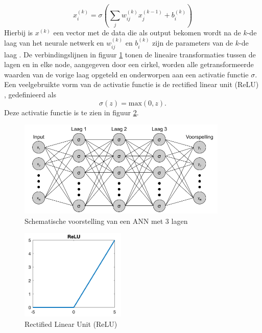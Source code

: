 \documentclass{report}
\begin{document}
\[ x^{(k)}_i = \sigma\left( \sum_j w^{(k)}_{ij} x^{(k-1)}_j + b^{(k)}_i \right) \]
Hierbij is $x^{(k)}$ een vector met de data die als output bekomen wordt na de $k$-de laag van het neurale netwerk en $w^{(k)}_{ij}$ en $b^{(k)}_i$ zijn de parameters van de $k$-de laag \cite{book:ann, online:cnn}. De verbindingslijnen in figuur \ref{fig:tem_ann_layers} tonen de lineaire transformaties tussen de lagen en in elke node, aangegeven door een cirkel, worden alle getransformeerde waarden van de vorige laag opgeteld en onderworpen aan een activatie functie $\sigma$. Een veelgebruikte vorm van de activatie functie is de rectified linear unit (ReLU) \cite{paper:relu}, gedefinieerd als
\[ \sigma(z) = \text{max}(0, z). \]
Deze activatie functie is te zien in figuur \ref{fig:tem_ann_activations}.
\begin{figure}[h!]
	\centering
	\includegraphics[width=10cm]{images/tem/ann_layers.png}
	\caption{Schematische voorstelling van een ANN met 3 lagen}
	\label{fig:tem_ann_layers}
\end{figure}
\begin{figure}[h!]
	\centering
	\includegraphics[width=5cm]{images/tem/ann_activations.png}
	\caption{Rectified Linear Unit (ReLU)}
	\label{fig:tem_ann_activations}
\end{figure}
\\ \\
\end{document}
